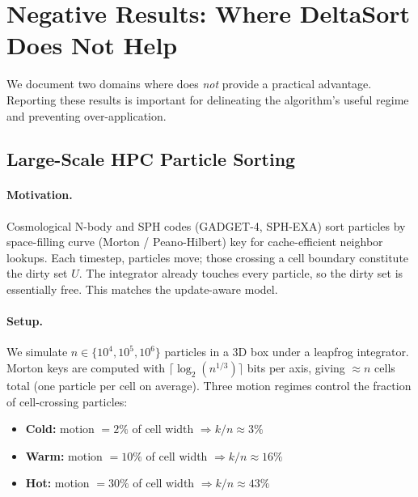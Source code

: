 \section{Negative Results: Where DeltaSort Does Not Help}
\label{sec:negative}

We document two domains where \DeltaSort does \emph{not} provide a practical
advantage.
Reporting these results is important for delineating the algorithm's useful regime
and preventing over-application.

\subsection{Large-Scale HPC Particle Sorting}
\label{sec:hpc}

\paragraph{Motivation.}
Cosmological N-body and SPH codes (GADGET-4, SPH-EXA) sort particles by
space-filling curve (Morton / Peano-Hilbert) key for cache-efficient neighbor
lookups.
Each timestep, particles move; those crossing a cell boundary constitute
the dirty set $U$.
The integrator already touches every particle, so the dirty set is essentially
free.
This matches the update-aware model.

\paragraph{Setup.}
We simulate $n \in \{10^4, 10^5, 10^6\}$ particles in a 3D box under a leapfrog
integrator.
Morton keys are computed with $\lceil \log_2(n^{1/3}) \rceil$ bits per axis,
giving $\approx n$ cells total (one particle per cell on average).
Three motion regimes control the fraction of cell-crossing particles:

\begin{itemize}
  \item \textbf{Cold:} motion $= 2\%$ of cell width $\Rightarrow k/n \approx 3\%$
  \item \textbf{Warm:} motion $= 10\%$ of cell width $\Rightarrow k/n \approx 16\%$
  \item \textbf{Hot:} motion $= 30\%$ of cell width $\Rightarrow k/n \approx 43\%$
\end{itemize}

